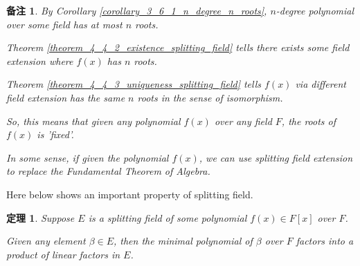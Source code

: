 \documentclass[utf8]{ctexbook}
\newtheorem{theorem}{定理}[section]
\newtheorem{memo}{备注}[section]
\begin{document}
\begin{memo}
By Corollary \ref{corollary_3_6_1_n_degree_n_roots}, $n$-degree polynomial over some field has at most $n$ roots.

Theorem \ref{theorem_4_4_2_existence_splitting_field} tells there exists some field extension where $f(x)$ has $n$ roots.

Theorem \ref{theorem_4_4_3_uniqueness_splitting_field} tells $f(x)$ via different field extension has the same $n$ roots in the sense of isomorphism.

So, this means that given any polynomial $f(x)$ over any field $F$, the roots of $f(x)$ is 'fixed'.

In some sense, if given the polynomial $f(x)$, we can use splitting field extension to replace the Fundamental Theorem of Algebra.

\end{memo}


Here below shows an important property of splitting field.

\begin{theorem}
\label{theorem_4_4_4_linear_factoring_splitting_field}
Suppose $E$ is a splitting field of some polynomial $f(x) \in F[x]$ over $F$. 

Given any element $\beta \in E$, then the minimal polynomial of $\beta$ over $F$ factors into a product of linear factors in $E$. 
\end{theorem}
\end{document}
